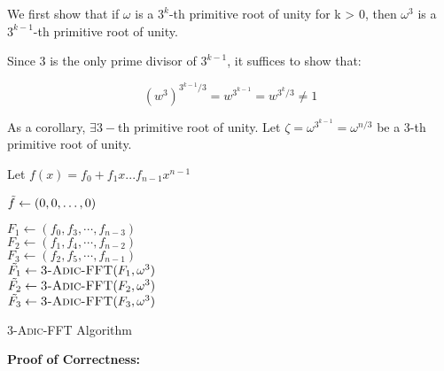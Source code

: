 We first show that if $\omega$ is a $3^k$-th primitive root of unity for k > 0, then $\omega^3$ is a $3^{k-1}$-th primitive root of unity.

Since 3 is the only prime divisor of $3^{k-1}$, it suffices to show that:

\[
    (w^3)^{3^{k-1}/3} = w^{3^{k-1}}
    = w^{3^k/3} \ne 1
\]

As a corollary, $\exists 3-$th primitive root of unity. Let $\zeta = \omega^{3^{k-1}} = \omega^{n/3}$ be a 3-th primitive root of unity.

Let $f(x) = f_0 + f_1 x ... f_{n-1} x^{n-1}$

\begin{algorithm}[H]
    \SetAlgoLined
        
        $\Tilde{f}\leftarrow (0,0,\ldots, 0)$

        $F_1 \leftarrow (f_0, f_3, \cdots, f_{n-3})$ \\
        $F_2 \leftarrow (f_1, f_4, \cdots, f_{n-2})$ \\
        $F_3 \leftarrow (f_2, f_5, \cdots, f_{n-1})$ \\[1\baselineskip]

        $\Tilde{F_1} \leftarrow \textsc{3-Adic-FFT}(F_1, \omega^3)$ \\
        $\Tilde{F_2} \leftarrow \textsc{3-Adic-FFT}(F_2, \omega^3)$ \\
        $\Tilde{F_3} \leftarrow \textsc{3-Adic-FFT}(F_3, \omega^3)$ \\[1\baselineskip]

        
        \;
    \caption{\textsc{3-Adic-FFT} Algorithm}
\end{algorithm}

\textbf{Proof of Correctness: } 

